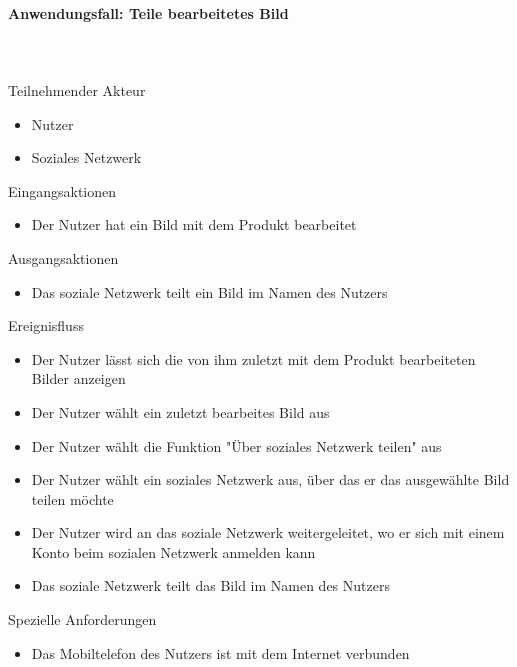 \documentclass[parskip=full]{scrartcl}
\newcommand{\paragraphashead}[1]{\paragraph{#1}\mbox{}\\\\}
\begin{document}
\paragraphashead{Anwendungsfall: Teile bearbeitetes Bild}
Teilnehmender Akteur
    \begin{itemize}\setlength\itemsep{-1em}
        \item Nutzer
        \item Soziales Netzwerk
    \end{itemize}
Eingangsaktionen
	\begin{itemize}\setlength\itemsep{-1em}
    	\item Der Nutzer hat ein Bild mit dem Produkt bearbeitet
    \end{itemize}
Ausgangsaktionen
	\begin{itemize}\setlength\itemsep{-1em}
        \item Das soziale Netzwerk teilt ein Bild im Namen des Nutzers
    \end{itemize}
Ereignisfluss
	\begin{itemize}\setlength\itemsep{-1em}
    	\item Der Nutzer lässt sich die von ihm zuletzt mit dem Produkt bearbeiteten Bilder anzeigen
        \item Der Nutzer wählt ein zuletzt bearbeites Bild aus
        \item Der Nutzer wählt die Funktion "Über soziales Netzwerk teilen" aus
        \item Der Nutzer wählt ein soziales Netzwerk aus, über das er das ausgewählte Bild teilen möchte
        \item Der Nutzer wird an das soziale Netzwerk weitergeleitet, wo er sich mit einem Konto beim sozialen Netzwerk anmelden kann
        \item Das soziale Netzwerk teilt das Bild im Namen des Nutzers
    \end{itemize}
Spezielle Anforderungen
\begin{itemize}\setlength\itemsep{-1em}
  \item Das Mobiltelefon des Nutzers ist mit dem Internet verbunden
\end{itemize}

\newpage

%
%
\printnoidxglossaries
\end{document}
